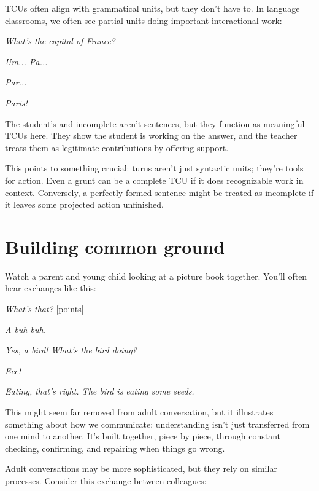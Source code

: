 TCUs often align with grammatical units, but they don't have to. In language classrooms, we often see partial units doing important interactional work:

\ea
\begin{dialogue}
\item[Teacher] \emph{What's the capital of France?}
\item[Student] \emph{Um... Pa...}
\item[Teacher] \emph{Par...}
\item[Student] \emph{Paris!}
\end{dialogue}
\z
The student's  and incomplete  aren't sentences, but they function as meaningful TCUs here. They show the student is working on the answer, and the teacher treats them as legitimate contributions by offering support.

This points to something crucial: turns aren't just syntactic units; they're tools for action. Even a grunt can be a complete TCU if it does recognizable work in context. Conversely, a perfectly formed sentence might be treated as incomplete if it leaves some projected action unfinished.

\section{Building common ground} \label{sec:common-ground}

Watch a parent and young child looking at a picture book together. You'll often hear exchanges like this:

\ea
\begin{dialogue}
\item[Parent] \emph{What's that?} [points]
\item[Child] \emph{A buh buh.}
\item[Parent] \emph{Yes, a bird! What's the bird doing?}
\item[Child] \emph{Eee!}
\item[Parent] \emph{Eating, that's right. The bird is eating some seeds.}
\end{dialogue}
\z
This might seem far removed from adult conversation, but it illustrates something about how we communicate: understanding isn't just transferred from one mind to another. It's built together, piece by piece, through constant checking, confirming, and repairing when things go wrong.

Adult conversations may be more sophisticated, but they rely on similar processes. Consider this exchange between colleagues:

